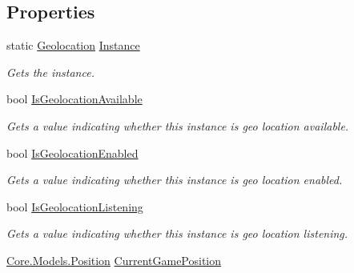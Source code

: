 \subsection*{Properties}
\begin{DoxyCompactItemize}
\item 
static \hyperlink{classClient_1_1Common_1_1Models_1_1Geolocation}{Geolocation} \hyperlink{classClient_1_1Common_1_1Models_1_1Geolocation_a9ecc93738f9ed1abc9c247ffa416ec61}{Instance}
\begin{DoxyCompactList}\small\item\em Gets the instance. \end{DoxyCompactList}\item 
bool \hyperlink{classClient_1_1Common_1_1Models_1_1Geolocation_ac61d7c4a25a8a8a3db55177ec8f0fb40}{Is\+Geolocation\+Available}
\begin{DoxyCompactList}\small\item\em Gets a value indicating whether this instance is geo location available. \end{DoxyCompactList}\item 
bool \hyperlink{classClient_1_1Common_1_1Models_1_1Geolocation_a4d17b1f0ad9cb37ed4d67097266ef214}{Is\+Geolocation\+Enabled}
\begin{DoxyCompactList}\small\item\em Gets a value indicating whether this instance is geo location enabled. \end{DoxyCompactList}\item 
bool \hyperlink{classClient_1_1Common_1_1Models_1_1Geolocation_a1d0e7e5bfd5ae8c366169c4c4a1d1747}{Is\+Geolocation\+Listening}
\begin{DoxyCompactList}\small\item\em Gets a value indicating whether this instance is geo location listening. \end{DoxyCompactList}\item 
\hyperlink{classCore_1_1Models_1_1Position}{Core.\+Models.\+Position} \hyperlink{classClient_1_1Common_1_1Models_1_1Geolocation_ad14334db3507a02eb7ecf245d0e4154c}{Current\+Game\+Position}

\end{DoxyCompactItemize}
